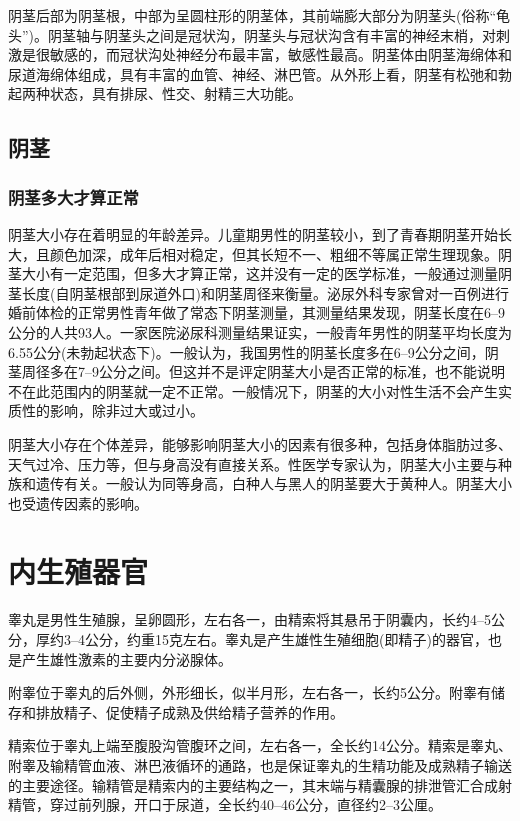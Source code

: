 \documentclass[12pt,UTF8]{ctexbook}
\begin{document}
阴茎后部为阴茎根，中部为呈圆柱形的阴茎体，其前端膨大部分为阴茎头(俗称“龟头”)。阴茎轴与阴茎头之间是冠状沟，阴茎头与冠状沟含有丰富的神经末梢，对刺激是很敏感的，而冠状沟处神经分布最丰富，敏感性最高。阴茎体由阴茎海绵体和尿道海绵体组成，具有丰富的血管、神经、淋巴管。从外形上看，阴茎有松弛和勃起两种状态，具有排尿、性交、射精三大功能。

\subsection{阴茎}

\subsubsection{阴茎多大才算正常}

阴茎大小存在着明显的年龄差异。儿童期男性的阴茎较小，到了青春期阴茎开始长大，且颜色加深，成年后相对稳定，但其长短不一、粗细不等属正常生理现象。阴茎大小有一定范围，但多大才算正常，这并没有一定的医学标准，一般通过测量阴茎长度(自阴茎根部到尿道外口)和阴茎周径来衡量。泌尿外科专家曾对一百例进行婚前体检的正常男性青年做了常态下阴茎测量，其测量结果发现，阴茎长度在6--9公分的人共93人。一家医院泌尿科测量结果证实，一般青年男性的阴茎平均长度为6.55公分(未勃起状态下)。一般认为，我国男性的阴茎长度多在6--9公分之间，阴茎周径多在7--9公分之间。但这并不是评定阴茎大小是否正常的标准，也不能说明不在此范围内的阴茎就一定不正常。一般情况下，阴茎的大小对性生活不会产生实质性的影响，除非过大或过小。

阴茎大小存在个体差异，能够影响阴茎大小的因素有很多种，包括身体脂肪过多、天气过冷、压力等，但与身高没有直接关系。性医学专家认为，阴茎大小主要与种族和遗传有关。一般认为同等身高，白种人与黑人的阴茎要大于黄种人。阴茎大小也受遗传因素的影响。

\section{内生殖器官}

睾丸是男性生殖腺，呈卵圆形，左右各一，由精索将其悬吊于阴囊内，长约4--5公分，厚约3--4公分，约重15克左右。睾丸是产生雄性生殖细胞(即精子)的器官，也是产生雄性激素的主要内分泌腺体。

附睾位于睾丸的后外侧，外形细长，似半月形，左右各一，长约5公分。附睾有储存和排放精子、促使精子成熟及供给精子营养的作用。

精索位于睾丸上端至腹股沟管腹环之间，左右各一，全长约14公分。精索是睾丸、附睾及输精管血液、淋巴液循环的通路，也是保证睾丸的生精功能及成熟精子输送的主要途径。输精管是精索内的主要结构之一，其末端与精囊腺的排泄管汇合成射精管，穿过前列腺，开口于尿道，全长约40--46公分，直径约2--3公厘。
\end{document}
